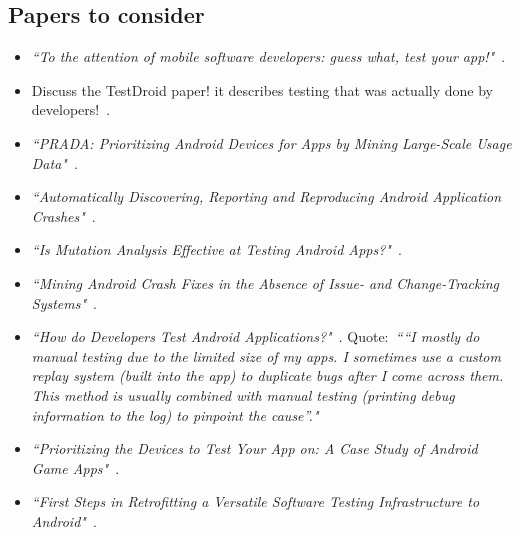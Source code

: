\subsection{Papers to consider}
\begin{itemize}
    \item \emph{``To the attention of mobile software developers: guess what, test your app!"}~\citep{cruz2019_guess_what_test_your_app}.
    
    \item Discuss the TestDroid paper! it describes testing that was actually done by developers!~\citet{kaasila2012_testdroid_etc}.
    
    \item \emph{``PRADA: Prioritizing Android Devices for Apps by Mining Large-Scale Usage Data"}~\citep{lu2016_PRADA}. 
        
    \item \emph{``Automatically Discovering, Reporting and Reproducing Android Application Crashes"}~\citep{moran2016_automatically_drr_android_app_crashes}.
    
    \item \emph{``Is Mutation Analysis Effective at Testing Android Apps?"}~\citep{deng2017_is_mutation_analysis_effective_at_testing_android_apps}.
    
    \item \emph{``Mining Android Crash Fixes in the Absence of Issue- and Change-Tracking Systems"}~\citep{kong2019_mining_android_crash_fixes}.
    
    \item \emph{``How do Developers Test Android Applications?"}~\citep{linares2017_how_do_developers_test_android_apps}. Quote:~\emph{``“I mostly do manual testing due to the limited size of my apps. I sometimes use a custom replay system (built into the app) to duplicate bugs after I come across them. This method is usually combined with manual testing (printing debug information to the log) to pinpoint the cause”."}
    
    \item \emph{``Prioritizing the Devices to Test Your App on: A Case Study of Android Game Apps"}~\citep{khalid2014_prioritizing_the_devices_to_test_your_app_on_casestudy_android_games}.
    
    \item \emph{``First Steps in Retrofitting a Versatile Software Testing Infrastructure to Android"}~\citep{oliver2018_first_steps_in_retrofitting_a_versatile_sw_testing_architecture}.
    

\end{itemize}
